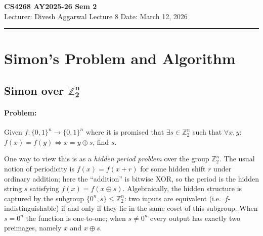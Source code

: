 \noindent
\textbf{CS4268 AY2025-26 Sem 2}
\\
\noindent
Lecturer: Divesh Aggarwal
\hfill
Lecture 8                      %
\hfill
Date: March 12, 2026          %


\noindent
\rule{\textwidth}{1pt}

\medskip


\section{Simon's Problem and Algorithm}

\subsection[\texorpdfstring{Simon over $\bm{\mathbb{Z}_2^n}$}{}]{Simon over $\bm{\mathbb{Z}_2^n}$} 

\paragraph{Problem:} Given $f: \{0,1\}^n \rightarrow \{0,1\}^n$ where it is promised that $\exists s \in \mathbb{Z}_2^n$ such that $\forall x,y$: $f(x)=f(y) \iff x=y\oplus s$, find $s$.

One way to view this is as a \emph{hidden period problem} over the group $\mathbb{Z}_2^n$. The usual notion of periodicity is $f(x)=f(x+r)$ for some hidden shift $r$ under ordinary addition; here the ``addition'' is bitwise XOR, so the period is the hidden string $s$ satisfying $f(x)=f(x \oplus s)$. Algebraically, the hidden structure is captured by the subgroup $\{0^n, s\} \leq \mathbb{Z}_2^n$: two inputs are equivalent (i.e.\ $f$-indistinguishable) if and only if they lie in the same coset of this subgroup. When $s=0^n$ the function is one-to-one; when $s\neq 0^n$ every output has exactly two preimages, namely $x$ and $x \oplus s$.

